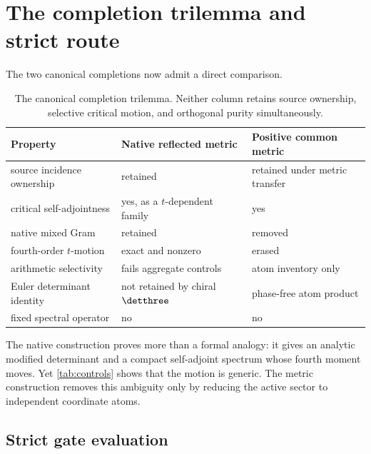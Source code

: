 \section{The completion trilemma and strict route}
\label{sec:route}

The two canonical completions now admit a direct comparison.

\begin{table}[H]
\centering
\small
\begin{tabularx}{\textwidth}{L{3.5cm}YY}
\toprule
Property & Native reflected metric & Positive common metric\\
\midrule
source incidence ownership & retained & retained under metric transfer\\
critical self-adjointness & yes, as a $t$-dependent family & yes\\
native mixed Gram & retained & removed\\
fourth-order $t$-motion & exact and nonzero & erased\\
arithmetic selectivity & fails aggregate controls & atom inventory only\\
Euler determinant identity & not retained by chiral $\detthree$ &
phase-free atom product\\
fixed spectral operator & no & no\\
\bottomrule
\end{tabularx}
\caption{The canonical completion trilemma.  Neither column retains
source ownership, selective critical motion, and orthogonal purity
simultaneously.}
\label{tab:trilemma}
\end{table}

The native construction proves more than a formal analogy: it gives
an analytic modified determinant and a compact self-adjoint spectrum
whose fourth moment moves.  Yet \cref{tab:controls} shows that the
motion is generic.  The metric construction removes this ambiguity
only by reducing the active sector to independent coordinate atoms.

\subsection{Strict gate evaluation}

